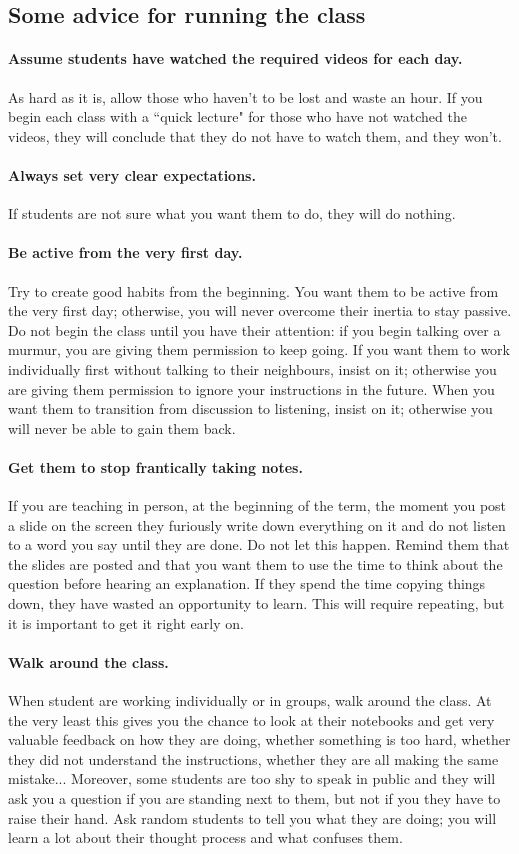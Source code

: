 \documentclass[11pt]{article}
\begin{document}
\subsection{Some advice for running the class} \label{sec:advice}
	\paragraph{Assume students have watched the required videos for each day.}  As hard as it is, allow those who haven't to be lost and waste an hour.  If you begin each class with a ``quick lecture" for those who have not watched the videos, they will conclude that they do not have to watch them, and they won't.
	\paragraph {Always set very clear expectations.}  If students are not sure what you want them to do, they will do nothing.   
	\paragraph{Be active from the very first day.}  Try to create good habits from the beginning.  You want them to be active from the very first day; otherwise, you will never overcome their inertia to stay passive.  Do not begin the class until you have their attention: if you begin talking over a murmur, you are giving them permission to keep going.  If you want them to work individually first without talking to their neighbours, insist on it; otherwise you are giving them permission to ignore your instructions in the future.   When you want them to transition from discussion to listening, insist on it; otherwise you will never be able to gain them back.
	\paragraph{Get them to stop frantically taking notes.}  If you are teaching in person, at the beginning of the term, the moment you post a slide on the screen they furiously write down everything on it and do not listen to a word you say until they are done.  Do not let this happen.  Remind them that the slides are posted and that you want them to use the time to think about the question before hearing an explanation.  If they spend the time copying things down, they have wasted an opportunity to learn.  This will require repeating, but it is important to get it right early on.
	\paragraph {Walk around the class.} When student are working individually or in groups, walk around the class.  At the very least this gives you the chance to look at their notebooks and get very valuable feedback on how they are doing, whether something is too hard, whether they did not understand the instructions, whether they are all making the same mistake...  Moreover, some students are too shy to speak in public and they will ask you a question if you are standing next to them, but not if you they have to raise their hand.  Ask random students to tell you what they are doing; you will learn a lot about their thought process and what confuses them.
\end{document}
